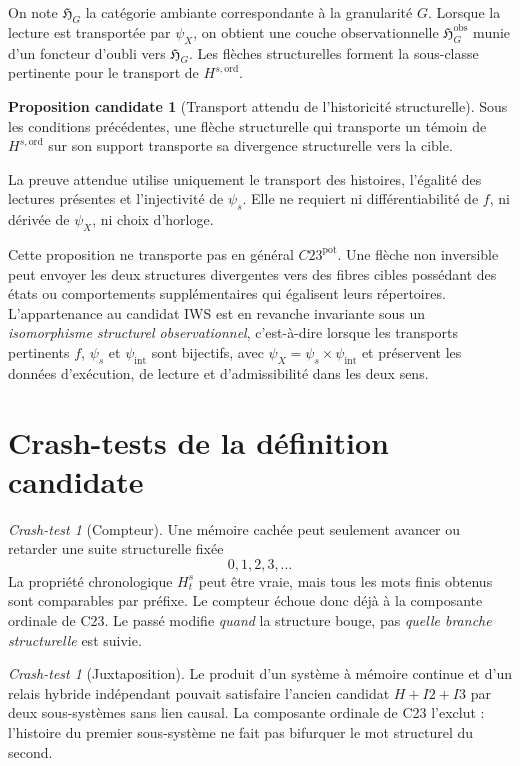 \documentclass[11pt,a4paper]{article}
\theoremstyle{definition}
\newtheorem{proposition}[definition]{Proposition candidate}
\theoremstyle{remark}
\newtheorem{crashtest}[definition]{Crash-test}
\newcommand{\Hyb}{\mathfrak H}
\begin{document}
On note $\Hyb_G$ la catégorie ambiante correspondante à la granularité $G$. Lorsque la lecture est transportée par $\psi_X$, on obtient une couche observationnelle $\Hyb_G^{\mathrm{obs}}$ munie d'un foncteur d'oubli vers $\Hyb_G$. Les flèches structurelles forment la sous-classe pertinente pour le transport de $H^{s,\mathrm{ord}}$.

\begin{proposition}[Transport attendu de l'historicité structurelle]
Sous les conditions précédentes, une flèche structurelle qui transporte un témoin de $H^{s,\mathrm{ord}}$ sur son support transporte sa divergence structurelle vers la cible.
\end{proposition}

La preuve attendue utilise uniquement le transport des histoires, l'égalité des lectures présentes et l'injectivité de $\psi_s$. Elle ne requiert ni différentiabilité de $f$, ni dérivée de $\psi_X$, ni choix d'horloge.

Cette proposition ne transporte pas en général $C23^{\mathrm{pot}}$. Une flèche non inversible peut envoyer les deux structures divergentes vers des fibres cibles possédant des états ou comportements supplémentaires qui égalisent leurs répertoires. L'appartenance au candidat IWS est en revanche invariante sous un \emph{isomorphisme structurel observationnel}, c'est-à-dire lorsque les transports pertinents $f$, $\psi_s$ et $\psi_{\mathrm{int}}$ sont bijectifs, avec $\psi_X=\psi_s\times\psi_{\mathrm{int}}$ et préservent les données d'exécution, de lecture et d'admissibilité dans les deux sens.

\section{Crash-tests de la définition candidate}

\begin{crashtest}[Compteur]
Une mémoire cachée peut seulement avancer ou retarder une suite structurelle fixée
\[
0,1,2,3,\ldots
\]
La propriété chronologique $H_t^s$ peut être vraie, mais tous les mots finis obtenus sont comparables par préfixe. Le compteur échoue donc déjà à la composante ordinale de C23. Le passé modifie \emph{quand} la structure bouge, pas \emph{quelle branche structurelle} est suivie.
\end{crashtest}

\begin{crashtest}[Juxtaposition]
Le produit d'un système à mémoire continue et d'un relais hybride indépendant pouvait satisfaire l'ancien candidat $H+I2+I3$ par deux sous-systèmes sans lien causal. La composante ordinale de C23 l'exclut : l'histoire du premier sous-système ne fait pas bifurquer le mot structurel du second.
\end{crashtest}
\end{document}
